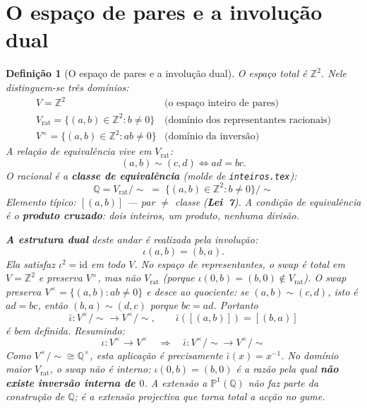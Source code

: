 \documentclass[11pt,a4paper]{article}
\newtheorem{definicao}{Definição}
\newcommand{\code}[1]{\texttt{\small #1}}
\begin{document}
\section{O espaço de pares e a involução dual}\label{sec:espaco}

\begin{definicao}[O espaço de pares e a involução dual]\label{def:espaco}
O espaço total é $\mathbb{Z}^{2}$. Nele distinguem-se três domínios:
\[
\boxed{\;
\begin{array}{ll}
V = \mathbb{Z}^{2} & \text{(o espaço inteiro de pares)}\\[3pt]
V_{\mathrm{rat}} = \{(a,b)\in\mathbb{Z}^{2}: b\neq 0\}
  & \text{(domínio dos representantes racionais)}\\[3pt]
V^{\times} = \{(a,b)\in\mathbb{Z}^{2}: ab\neq 0\}
  & \text{(domínio da inversão)}
\end{array}\;}
\]
A relação de equivalência vive em $V_{\mathrm{rat}}$:
\[
\boxed{\;(a,b)\sim(c,d)\iff ad=bc.\;}
\]
O racional é a \textbf{classe de equivalência} (molde de
\code{inteiros.tex}):
\[
\boxed{\;
\mathbb{Q}=V_{\mathrm{rat}}/{\sim}
\;=\;\{(a,b)\in\mathbb{Z}^{2}:b\neq 0\}/{\sim}\;}
\]
Elemento típico: $[(a,b)]$ --- par $\neq$ classe (\textbf{Lei~7}).
A condição de
equivalência é o \textbf{produto cruzado}: dois inteiros, um produto, nenhuma
divisão.

\medskip\noindent
\textbf{A estrutura dual} deste andar é realizada pela involução:
\[
\boxed{\;\iota(a,b)=(b,a).\;}
\]
Ela satisfaz $\iota^{2}=\mathrm{id}$ em todo $V$. No espaço de
representantes, o swap é total em $V=\mathbb{Z}^{2}$ e preserva $V^{\times}$,
mas não $V_{\mathrm{rat}}$ (porque $\iota(0,b)=(b,0)\notin V_{\mathrm{rat}}$).
O swap preserva $V^{\times}=\{(a,b):ab\neq0\}$ e desce ao quociente: se
$(a,b)\sim(c,d)$, isto é $ad=bc$, então $(b,a)\sim(d,c)$ porque $bc=ad$.
Portanto
\[
\bar\iota:V^{\times}/{\sim}\longrightarrow V^{\times}/{\sim},
\qquad\bar\iota([(a,b)])=[(b,a)]
\]
é bem definida. Resumindo:
\[
\boxed{
\iota:V^{\times}\to V^{\times}
\quad\Longrightarrow\quad
\bar\iota:V^{\times}/{\sim}\to V^{\times}/{\sim}
}
\]
Como $V^{\times}/{\sim}\cong\mathbb{Q}^{\times}$, esta aplicação é
precisamente $\bar\iota(x)=x^{-1}$. No domínio maior $V_{\mathrm{rat}}$, o
swap não é interno: $\iota(0,b)=(b,0)$ é a razão pela qual \textbf{não existe
inversão interna de $0$}. A extensão a $\mathbb{P}^{1}(\mathbb{Q})$ não faz parte da
construção de $\mathbb{Q}$; é a extensão projectiva que torna total a acção no
gume.


\end{definicao}
\end{document}
